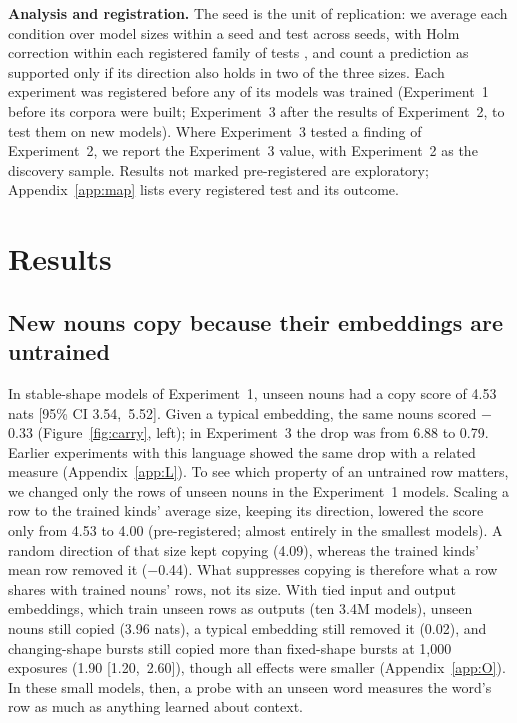 \documentclass[11pt]{article}
\begin{document}
\textbf{Analysis and registration.} The seed is the unit of replication: we average each condition over model sizes within a seed and test across seeds, with Holm correction within each registered family of tests \citep{holm1979}, and count a prediction as supported only if its direction also holds in two of the three sizes. Each experiment was registered before any of its models was trained (Experiment~1 before its corpora were built; Experiment~3 after the results of Experiment~2, to test them on new models). Where Experiment~3 tested a finding of Experiment~2, we report the Experiment~3 value, with Experiment~2 as the discovery sample. Results not marked pre-registered are exploratory; Appendix~\ref{app:map} lists every registered test and its outcome.

\section{Results}\label{sec:results}

\subsection{New nouns copy because their embeddings are untrained}\label{sec:rows}
In stable-shape models of Experiment~1, unseen nouns had a copy score of 4.53 nats [95\% CI 3.54,~5.52]. Given a typical embedding, the same nouns scored $-$0.33 (Figure~\ref{fig:carry}, left); in Experiment~3 the drop was from 6.88 to 0.79. Earlier experiments with this language showed the same drop with a related measure (Appendix~\ref{app:L}). To see which property of an untrained row matters, we changed only the rows of unseen nouns in the Experiment~1 models. Scaling a row to the trained kinds' average size, keeping its direction, lowered the score only from 4.53 to 4.00 (pre-registered; almost entirely in the smallest models). A random direction of that size kept copying (4.09), whereas the trained kinds' mean row removed it ($-$0.44). What suppresses copying is therefore what a row shares with trained nouns' rows, not its size. With tied input and output embeddings, which train unseen rows as outputs (ten 3.4M models), unseen nouns still copied (3.96 nats), a typical embedding still removed it (0.02), and changing-shape bursts still copied more than fixed-shape bursts at 1,000 exposures (1.90 [1.20,~2.60]), though all effects were smaller (Appendix~\ref{app:O}). In these small models, then, a probe with an unseen word measures the word's row as much as anything learned about context.
\end{document}
